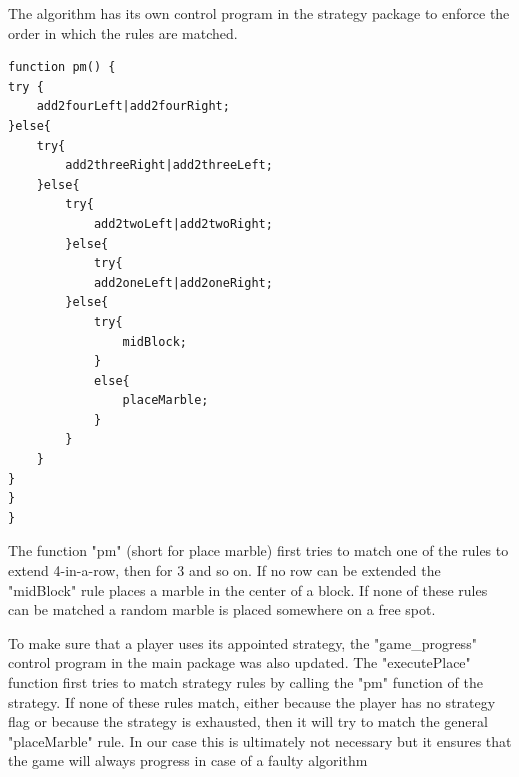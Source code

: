 The algorithm  has its own control program in the strategy package to enforce the order in which the rules are matched.

\begin{lstlisting}
function pm() {
try {
	add2fourLeft|add2fourRight;
}else{
	try{
		add2threeRight|add2threeLeft;
	}else{
		try{
			add2twoLeft|add2twoRight;
		}else{
			try{
			add2oneLeft|add2oneRight;
		}else{
			try{
				midBlock;
			}
			else{
				placeMarble;
			}
		}
	}
}
}
}
\end{lstlisting}
The function "pm" (short for place marble) first tries to match one of the rules to extend 4-in-a-row, then for 3 and so on. If no row can be extended the "midBlock" rule  places a marble in the center of a block. If none of these rules can be matched a random marble is placed somewhere on a free spot.

To make sure that a player uses its appointed strategy, the "game\_progress" control program in the main package was also updated.
The "executePlace" function first tries to match strategy rules by calling the "pm" function of the strategy. If none of these rules match, either because the player has no strategy flag or because the strategy is exhausted, then it will try to match the general "placeMarble" rule. 
In our case this is ultimately not necessary but it ensures that the game will always progress in case of a faulty algorithm

